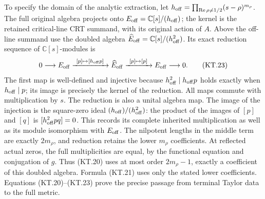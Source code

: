 To specify the domain of the analytic extraction, let
\(h_{\rm off}=\prod_{\operatorname{Re}\rho\ne1/2}
(s-\rho)^{m_\rho}\).  The full original algebra projects onto
\(E_{\rm off}=\mathbb C[s]/(h_{\rm off})\); the kernel is
the retained critical-line CRT summand, with its original action
of \(A\).  Above the off-line summand use the doubled algebra
\(\widehat E_{\rm off}=\mathbb C[s]/(h_{\rm off}^2)\).
Its exact reduction sequence of \(\mathbb C[s]\)-modules is
\[
 0\longrightarrow E_{\rm off}
   \xrightarrow{\ [p]\mapsto[h_{\rm off}p]\ }
   \widehat E_{\rm off}
   \xrightarrow{\ [p]\mapsto[p]\ } E_{\rm off}
   \longrightarrow0.                                   \tag{KT.23}
\]
The first map is well-defined and injective because
\(h_{\rm off}^2\mid h_{\rm off}p\) holds exactly when
\(h_{\rm off}\mid p\); its image is precisely the kernel
of the reduction.  All maps commute with multiplication by \(s\).
The reduction is also a unital algebra map.  The image of the
injection is the square-zero ideal \((h_{\rm off})/(h_{\rm off}^2)\):
the product of the images of \([p]\) and \([q]\) is
\([h_{\rm off}^2pq]=0\).  This records its complete inherited
multiplication as well as its module isomorphism with \(E_{\rm off}\).
The nilpotent lengths in the middle term are exactly
\(2m_\rho\), and reduction retains the lower \(m_\rho\)
coefficients.  At reflected actual zeros, the full multiplicities
are equal, by the functional equation and conjugation of \(g\).
Thus (KT.20) uses at most order \(2m_\rho-1\), exactly a
coefficient of this doubled algebra.  Formula (KT.21) uses only
the stated lower coefficients.  Equations (KT.20)--(KT.23) prove
the precise passage from terminal Taylor data to the full metric.

